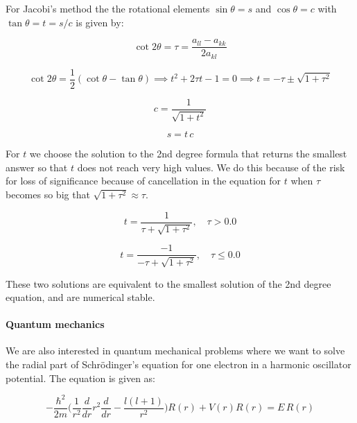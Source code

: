 \documentclass[a4paper, fontsize=11pt]{article}
\begin{document}
For Jacobi's method the the rotational elements $\sin \theta = s$ and $\cos \theta = c$ with $\tan \theta = t = s / c$ is given by:

\begin{equation}
\cot 2\theta = \tau = \frac{a_{ll} - a_{kk}}{2 a_{kl}}
\end{equation}

\begin{equation}
\cot 2\theta = \frac{1}{2}\left(\cot \theta - \tan \theta \right) \implies t^2 + 2 \tau t - 1 = 0 \implies t = -\tau \pm \sqrt{1 + \tau^2} 
\end{equation}

\begin{equation}
c = \frac{1}{\sqrt{1+ t^2}}
\end{equation}

\begin{equation}
s = t\,c
\end{equation}

For $t$ we choose the solution to the 2nd degree formula that returns the smallest answer so that $t$ does not reach very high values. We do this because of the risk for loss of significance because of cancellation in the equation for $t$ when $\tau$ becomes so big that $\sqrt{1 + \tau^2} \approx \tau $.

\begin{equation}
t = \frac{1}{\tau + \sqrt{1 + \tau^2}}, \quad \tau > 0.0
\end{equation}

\begin{equation}
t = \frac{-1}{-\tau + \sqrt{1 + \tau^2}}, \quad \tau \leq 0.0
\end{equation}

These two solutions are equivalent to the smallest solution of the 2nd degree equation, and are numerical stable.

\paragraph{Quantum mechanics}
We are also interested in quantum mechanical problems where we want to solve the radial part of Schr\"{o}dinger's equation for one electron in a harmonic oscillator potential. The equation is given as:

\begin{equation}
-\dfrac{\hbar^2}{2m}\Big(\dfrac{1}{r^2} \dfrac{d}{dr} r^2 \dfrac{d}{dr} - \dfrac{l(l+1)}{r^2} \Big) R(r) +V(r)R(r)=E \, R(r)
\end{equation}
\end{document}
